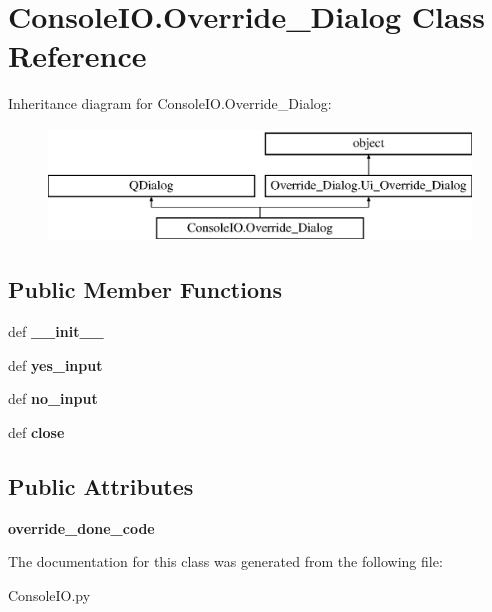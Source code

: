 \hypertarget{classConsoleIO_1_1Override__Dialog}{\section{Console\-I\-O.\-Override\-\_\-\-Dialog Class Reference}
\label{classConsoleIO_1_1Override__Dialog}
}
Inheritance diagram for Console\-I\-O.\-Override\-\_\-\-Dialog\-:\begin{figure}[H]
\begin{center}
\leavevmode
\includegraphics[height=3.000000cm]{classConsoleIO_1_1Override__Dialog}
\end{center}
\end{figure}
\subsection*{Public Member Functions}
\begin{DoxyCompactItemize}
\item 
\hypertarget{classConsoleIO_1_1Override__Dialog_aa15cd0546885e3d9943018d155a7538f}{def {\bfseries \-\_\-\-\_\-init\-\_\-\-\_\-}}\label{classConsoleIO_1_1Override__Dialog_aa15cd0546885e3d9943018d155a7538f}

\item 
\hypertarget{classConsoleIO_1_1Override__Dialog_a6afe1bfec98f696850eae66a89a9b312}{def {\bfseries yes\-\_\-input}}\label{classConsoleIO_1_1Override__Dialog_a6afe1bfec98f696850eae66a89a9b312}

\item 
\hypertarget{classConsoleIO_1_1Override__Dialog_a5c5aa5c0030a6820a900f3217309a91c}{def {\bfseries no\-\_\-input}}\label{classConsoleIO_1_1Override__Dialog_a5c5aa5c0030a6820a900f3217309a91c}

\item 
\hypertarget{classConsoleIO_1_1Override__Dialog_aeefa5a9c5257908082b0b636cd1692bb}{def {\bfseries close}}\label{classConsoleIO_1_1Override__Dialog_aeefa5a9c5257908082b0b636cd1692bb}

\end{DoxyCompactItemize}
\subsection*{Public Attributes}
\begin{DoxyCompactItemize}
\item 
\hypertarget{classConsoleIO_1_1Override__Dialog_a1a0207cdd4dd354bcf0d382b6e2f0ab9}{{\bfseries override\-\_\-done\-\_\-code}}\label{classConsoleIO_1_1Override__Dialog_a1a0207cdd4dd354bcf0d382b6e2f0ab9}

\end{DoxyCompactItemize}


The documentation for this class was generated from the following file\-:\begin{DoxyCompactItemize}
\item 
Console\-I\-O.\-py\end{DoxyCompactItemize}
